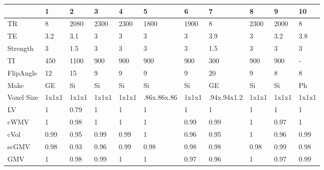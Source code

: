 \begin{table}
[]
\centering
\begin{tabular}{lllllllllll}
\toprule
{} &     1  &     2  &     3  &     4  &                    5  &     6  &                    7  &     8  &     9  &     10 \\
\midrule
TR                            &      8 &   2080 &   2300 &   2300 &                  1800 &   1900 &                     8 &   2300 &   2000 &      8 \\
TE                            &    3.2 &    3.1 &      3 &      3 &                     3 &      3 &                   3.9 &      3 &    3.2 &    3.8 \\
Strength                      &      3 &    1.5 &      3 &      3 &                     3 &      3 &                   1.5 &      3 &      3 &      3 \\
TI                            &    450 &   1100 &    900 &    900 &                   900 &    900 &                   300 &    900 &    900 &      - \\
FlipAngle                     &     12 &     15 &      9 &      9 &                     9 &      9 &                    20 &      9 &      8 &      8 \\
Make                          &     GE &     Si &     Si &     Si &                    Si &     Si &                    GE &     Si &     Si &     Ph \\
Voxel Size                    &  1x1x1 &  1x1x1 &  1x1x1 &  1x1x1 &  .86x.86x.86 &  1x1x1 &  .94x.94x1.2 &  1x1x1 &  1x1x1 &  1x1x1 \\
\bottomrule
LV             &      1 &   0.79 &      1 &      1 &                     1 &      1 &                     1 &      1 &      1 &      1 \\
cWMV        &      1 &   0.98 &      1 &      1 &                     1 &   0.99 &                  0.99 &      1 &   0.97 &      1 \\
cVol                   &   0.99 &   0.95 &   0.99 &   0.99 &                     1 &   0.96 &                  0.95 &      1 &   0.96 &   0.99 \\
scGMV                &   0.98 &   0.93 &   0.96 &   0.99 &                  0.98 &   0.98 &                  0.98 &   0.98 &   0.99 &   0.98 \\
GMV                  &      1 &   0.98 &   0.99 &      1 &                     1 &   0.97 &                  0.96 &      1 &   0.97 &   0.99 \\

\end{tabular}
\end{table}
